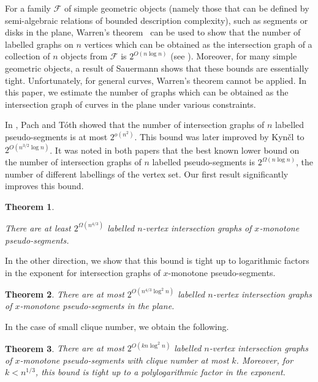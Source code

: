 \documentclass[11pt]{article}
\theoremstyle{plain}
\newtheorem{theorem}{Theorem}[section]
\theoremstyle{definition}
\theoremstyle{remark}
\begin{document}
For a family $\mathcal{F}$ of simple geometric objects (namely those that can be defined by semi-algebraic relations of bounded description complexity), such as segments or disks in the plane, Warren's theorem~\cite{W} can be used to show that the number of labelled graphs on $n$ vertices which can be obtained as the intersection graph of a collection of $n$ objects from $\mathcal{F}$ is $2^{O(n\log n)}$ (see \cite{PS,MM}).  Moreover, for many simple geometric objects, a result of Sauermann \cite{S} shows that these bounds are essentially tight.  Unfortunately, for general curves, Warren's theorem cannot be applied.  In this paper, we estimate the number of graphs which can be obtained as the intersection graph of curves in the plane under various constraints.

In \cite{PT06}, Pach and T\'oth showed that the number of intersection graphs of $n$ labelled pseudo-segments is at most $2^{o(n^2)}$.  This bound was later improved by Kyn\v cl \cite{K13} to $2^{O(n^{3/2}\log n)}$. It was noted in both papers that the best known lower bound on the number of intersection graphs of $n$ labelled pseudo-segments is $2^{\Omega(n\log n)}$, the number of different labellings of the vertex set.  Our first result significantly improves this bound.

\begin{theorem}\label{main0}


There are at least $2^{\Omega(n^{4/3})}$ labelled $n$-vertex intersection graphs of $x$-monotone pseudo-segments. 

\end{theorem}



\noindent In the other direction, we show that this bound is tight up to logarithmic factors in the exponent for intersection graphs of $x$-monotone pseudo-segments.  






\begin{theorem}\label{main12}
There are at most $2^{O(n^{4/3}\log^2n)}$ labelled $n$-vertex intersection graphs of $x$-monotone pseudo-segments in the plane.
    \end{theorem}

 


In the case of small clique number, we obtain the following.



\begin{theorem}\label{main3}
There are at most $2^{O(kn\log^2 n)}$ labelled $n$-vertex intersection graphs of $x$-monotone pseudo-segments with clique number at most $k$.  Moreover, for $k < n^{1/3}$, this bound is tight up to a polylogarithmic factor in the exponent.

\end{theorem}
 
\end{document}
